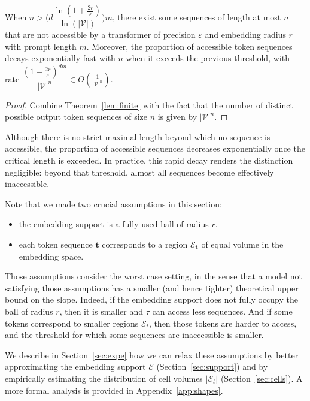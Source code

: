 \begin{corollary}\label{thm:finite}
    When $n>\Bigg(d\dfrac{\operatorname{ln}(1+\frac {2r}{\varepsilon})}{\operatorname{ln}(|\mathcal V|)}\Bigg)m$, there exist some sequences of length at most $n$ that are not accessible by a transformer of precision $\varepsilon$ and embedding radius $r$ with prompt length $m$. Moreover, the proportion of accessible token sequences decays exponentially fast with $n$ when it exceeds the previous threshold, with rate $\dfrac{(1+\frac {2r}{\varepsilon})^{dm}}{|\mathcal V|^n}\in O(\frac1{|\mathcal V|^n})$.
\end{corollary}


\begin{proof}
   Combine Theorem~\ref{lem:finite} with the fact that the number of distinct possible output token sequences of size $n$ is given by $|\mathcal V|^n$.
\end{proof}

\begin{remark}
    Although there is no strict maximal length beyond which no sequence is accessible, the proportion of accessible sequences decreases exponentially once the critical length is exceeded. 
    In practice, this rapid decay renders the distinction negligible: beyond that threshold, almost all sequences become effectively inaccessible.
\end{remark}

Note that we made two crucial assumptions in this section:
\begin{itemize}
    \item the embedding support is a fully used ball of radius $r$.
    \item each token sequence $\mathbf t$ corresponds to a region $\mathcal{E}_{\mathbf t}$ of equal volume in the embedding space. 
\end{itemize}

Those assumptions consider the worst case setting, in the sense that a model not satisfying those assumptions has a smaller (and hence tighter) theoretical upper bound on the slope. Indeed, if the embedding support does not fully occupy the ball of radius $r$, then it is smaller and $\tau$ can access less sequences. And if some tokens correspond to smaller regions $\mathcal{E}_t$, then those tokens are harder to access, and the threshold for which some sequences are inaccessible is smaller.

We describe in Section~\ref{sec:expe} how we can relax these assumptions by better approximating the embedding support $\mathcal{E}$ (Section~\ref{sec:support}) and by empirically estimating the distribution of cell volumes $|\mathcal{E}_t|$ (Section~\ref{sec:cells}). A more formal analysis is provided in Appendix~\ref{app:shapes}.


